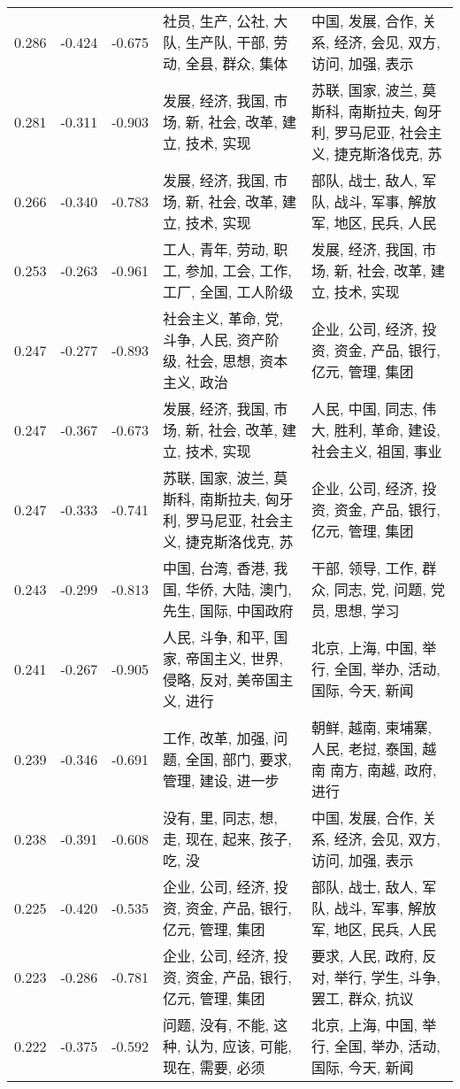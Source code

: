 \begin{tabular}{cccp{5cm}p{5cm}}
0.286 & -0.424 & -0.675 & 社员, 生产, 公社, 大队, 生产队, 干部, 劳动, 全县, 群众, 集体 & 中国, 发展, 合作, 关系, 经济, 会见, 双方, 访问, 加强, 表示 \\
0.281 & -0.311 & -0.903 & 发展, 经济, 我国, 市场, 新, 社会, 改革, 建立, 技术, 实现 & 苏联, 国家, 波兰, 莫斯科, 南斯拉夫, 匈牙利, 罗马尼亚, 社会主义, 捷克斯洛伐克, 苏 \\
0.266 & -0.340 & -0.783 & 发展, 经济, 我国, 市场, 新, 社会, 改革, 建立, 技术, 实现 & 部队, 战士, 敌人, 军队, 战斗, 军事, 解放军, 地区, 民兵, 人民 \\
0.253 & -0.263 & -0.961 & 工人, 青年, 劳动, 职工, 参加, 工会, 工作, 工厂, 全国, 工人阶级 & 发展, 经济, 我国, 市场, 新, 社会, 改革, 建立, 技术, 实现 \\
0.247 & -0.277 & -0.893 & 社会主义, 革命, 党, 斗争, 人民, 资产阶级, 社会, 思想, 资本主义, 政治 & 企业, 公司, 经济, 投资, 资金, 产品, 银行, 亿元, 管理, 集团 \\
0.247 & -0.367 & -0.673 & 发展, 经济, 我国, 市场, 新, 社会, 改革, 建立, 技术, 实现 & 人民, 中国, 同志, 伟大, 胜利, 革命, 建设, 社会主义, 祖国, 事业 \\
0.247 & -0.333 & -0.741 & 苏联, 国家, 波兰, 莫斯科, 南斯拉夫, 匈牙利, 罗马尼亚, 社会主义, 捷克斯洛伐克, 苏 & 企业, 公司, 经济, 投资, 资金, 产品, 银行, 亿元, 管理, 集团 \\
0.243 & -0.299 & -0.813 & 中国, 台湾, 香港, 我国, 华侨, 大陆, 澳门, 先生, 国际, 中国政府 & 干部, 领导, 工作, 群众, 同志, 党, 问题, 党员, 思想, 学习 \\
0.241 & -0.267 & -0.905 & 人民, 斗争, 和平, 国家, 帝国主义, 世界, 侵略, 反对, 美帝国主义, 进行 & 北京, 上海, 中国, 举行, 全国, 举办, 活动, 国际, 今天, 新闻 \\
0.239 & -0.346 & -0.691 & 工作, 改革, 加强, 问题, 全国, 部门, 要求, 管理, 建设, 进一步 & 朝鲜, 越南, 柬埔寨, 人民, 老挝, 泰国, 越南 南方, 南越, 政府, 进行 \\
0.238 & -0.391 & -0.608 & 没有, 里, 同志, 想, 走, 现在, 起来, 孩子, 吃, 没 & 中国, 发展, 合作, 关系, 经济, 会见, 双方, 访问, 加强, 表示 \\
0.225 & -0.420 & -0.535 & 企业, 公司, 经济, 投资, 资金, 产品, 银行, 亿元, 管理, 集团 & 部队, 战士, 敌人, 军队, 战斗, 军事, 解放军, 地区, 民兵, 人民 \\
0.223 & -0.286 & -0.781 & 企业, 公司, 经济, 投资, 资金, 产品, 银行, 亿元, 管理, 集团 & 要求, 人民, 政府, 反对, 举行, 学生, 斗争, 罢工, 群众, 抗议 \\
0.222 & -0.375 & -0.592 & 问题, 没有, 不能, 这种, 认为, 应该, 可能, 现在, 需要, 必须 & 北京, 上海, 中国, 举行, 全国, 举办, 活动, 国际, 今天, 新闻 \\

\end{tabular}
